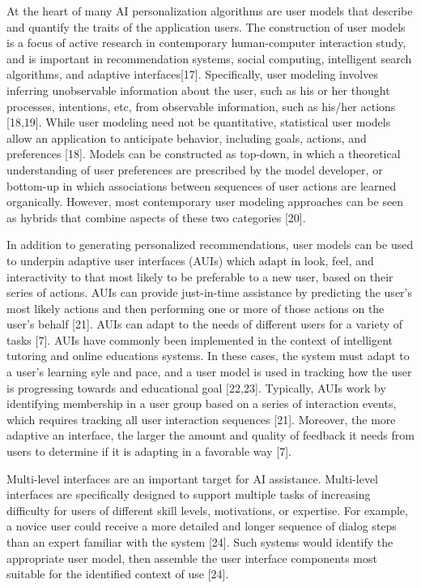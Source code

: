 \documentclass[]{article}
\begin{document}
At the heart of many AI personalization algorithms are user models that
describe and quantify the traits of the application users. The
construction of user models is a focus of active research in
contemporary human-computer interaction study, and is important in
recommendation systems, social computing, intelligent search algorithms,
and adaptive interfaces{[}17{]}. Specifically, user modeling involves
inferring unobservable information about the user, such as his or her
thought processes, intentions, etc, from observable information, such as
his/her actions {[}18,19{]}. While user modeling need not be
quantitative, statistical user models allow an application to anticipate
behavior, including goals, actions, and preferences {[}18{]}. Models can
be constructed as top-down, in which a theoretical understanding of user
preferences are prescribed by the model developer, or bottom-up in which
associations between sequences of user actions are learned organically.
However, most contemporary user modeling approaches can be seen as
hybrids that combine aspects of these two categories {[}20{]}.

In addition to generating personalized recommendations, user models can
be used to underpin adaptive user interfaces (AUIs) which adapt in look,
feel, and interactivity to that most likely to be preferable to a new
user, based on their series of actions. AUIs can provide just-in-time
assistance by predicting the user's most likely actions and then
performing one or more of those actions on the user's behalf {[}21{]}.
AUIs can adapt to the needs of different users for a variety of tasks
{[}7{]}. AUIs have commonly been implemented in the context of
intelligent tutoring and online educations systems. In these cases, the
system must adapt to a user's learning syle and pace, and a user model
is used in tracking how the user is progressing towards and educational
goal {[}22,23{]}. Typically, AUIs work by identifying membership in a
user group based on a series of interaction events, which requires
tracking all user interaction sequences {[}21{]}. Moreover, the more
adaptive an interface, the larger the amount and quality of feedback it
needs from users to determine if it is adapting in a favorable way
{[}7{]}.

Multi-level interfaces are an important target for AI assistance.
Multi-level interfaces are specifically designed to support multiple
tasks of increasing difficulty for users of different skill levels,
motivations, or expertise. For example, a novice user could receive a
more detailed and longer sequence of dialog steps than an expert
familiar with the system {[}24{]}. Such systems would identify the
appropriate user model, then assemble the user interface components most
suitable for the identified context of use {[}24{]}.
\end{document}
